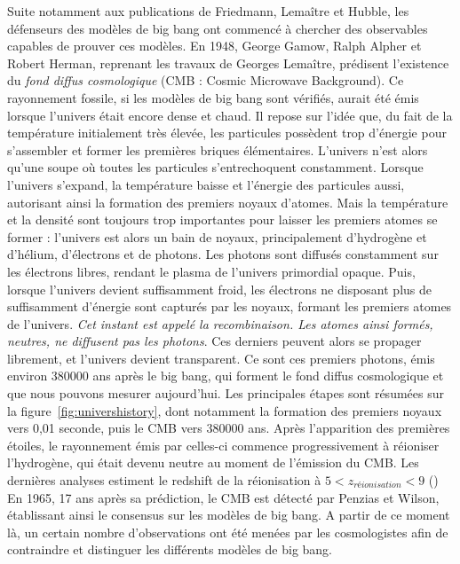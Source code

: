 \documentclass[11pt, twoside, a4paper, openright]{report}
\begin{document}
Suite notamment aux publications de Friedmann, Lemaître et Hubble, les défenseurs des modèles de big bang ont commencé à chercher des observables capables de prouver ces modèles. En 1948, George Gamow, Ralph Alpher et Robert Herman, reprenant les travaux de Georges Lemaître, prédisent l'existence du \emph{fond diffus cosmologique} (CMB : Cosmic Microwave Background). Ce rayonnement fossile, si les modèles de big bang sont vérifiés, aurait été émis lorsque l'univers était encore dense et chaud. Il repose sur l'idée que, du fait de la température initialement très élevée, les particules possèdent trop d'énergie pour s'assembler et former les premières briques élémentaires. L'univers n'est alors qu'une soupe où toutes les particules s'entrechoquent constamment. Lorsque l'univers s'expand, la température baisse et l'énergie des particules aussi, autorisant ainsi la formation des premiers noyaux d'atomes. Mais la température et la densité sont toujours trop importantes pour laisser les premiers atomes se former : l'univers est alors un bain de noyaux, principalement d'hydrogène et d'hélium, d'électrons et de photons. Les photons sont diffusés constamment sur les électrons libres, rendant le plasma de l'univers primordial opaque. Puis, lorsque l'univers devient suffisamment froid, les électrons ne disposant plus de suffisamment d'énergie sont capturés par les noyaux, formant les premiers atomes de l'univers. \emph{Cet instant est appelé la recombinaison. Les atomes ainsi formés, neutres, ne diffusent pas les photons}. Ces derniers peuvent alors se propager librement, et l'univers devient transparent. Ce sont ces premiers photons, émis environ \num{380000} ans après le big bang, qui forment le fond diffus cosmologique et que nous pouvons mesurer aujourd'hui. Les principales étapes sont résumées sur la figure~\ref{fig:univershistory}, dont notamment la formation des premiers noyaux vers 0,01 seconde, puis le CMB vers \num{380000} ans.
Après l'apparition des premières étoiles, le rayonnement émis par celles-ci commence progressivement à réioniser l'hydrogène, qui était devenu neutre au moment de l'émission du CMB. Les dernières analyses estiment le redshift de la réionisation à $5 < z_{réionisation} < 9$ (\cite{Collaboration2018})
En 1965, 17 ans après sa prédiction, le CMB est détecté par Penzias et Wilson, établissant ainsi le consensus sur les modèles de big bang. A partir de ce moment là, un certain nombre d'observations ont été menées par les cosmologistes afin de contraindre et distinguer les différents modèles de big bang.
\end{document}
